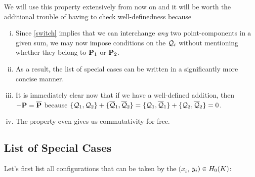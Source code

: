 \documentclass[english,11pt,a4paper]{article}
\begin{document}
\vspace{2mm}
\begin{remark}
We will use this property extensively from now on and it will be worth the additional trouble of having to check well-definedness because
\begin{enumerate}[(i)]\parskip 0mm
	\item Since \eqref{switch} implies that we can interchange \textit{any} two point-components in a given sum, we may now impose conditions on the $\q_i$ without mentioning whether they belong to $\P_1$ or $\P_2$.
	\item As a result, the list of special cases can be written in a significantly more concise manner.
	\item It is immediately clear now that if we have a well-defined addition, then $-\P = \bar \P$ because $\{ \q_1 , \q_2 \} + \{ \bar \q_1 , \bar \q_2 \} = \{ \q_1 , \bar \q_1 \} + \{ \q_2 , \bar \q_2 \}=0$.
	\item The property even gives us commutativity for free.
\end{enumerate}
\parskip 3mm
\end{remark}


\newpage
\subsection{List of Special Cases}

Let's first list all configurations that can be taken by the $(x_i$, $y_i) \in \enk$:
\end{document}
